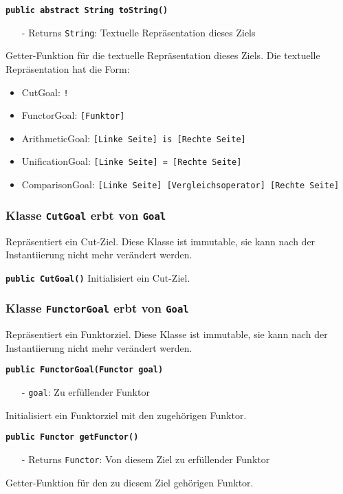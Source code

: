 \documentclass[parskip=full,11pt,twoside]{scrartcl}
\begin{document}
\textbf{\texttt{public abstract String toString()}}
\begin{itemize}[noitemsep]
	\item[-] Returns \texttt{String}: Textuelle Repräsentation dieses Ziels
\end{itemize}
Getter-Funktion für die textuelle Repräsentation dieses Ziels. Die textuelle Repräsentation hat die Form:
\begin{itemize}
	\item CutGoal: \texttt{!}
	\item FunctorGoal: \texttt{[Funktor]}
	\item ArithmeticGoal: \texttt{[Linke Seite] is [Rechte Seite]}
	\item UnificationGoal: \texttt{[Linke Seite] = [Rechte Seite]}
	\item ComparisonGoal: \texttt{[Linke Seite] [Vergleichsoperator] [Rechte Seite]}
\end{itemize}

\subsubsection{Klasse \texttt{CutGoal} erbt von \texttt{Goal}}
Repräsentiert ein Cut-Ziel. Diese Klasse ist immutable, sie kann nach der Instantiierung nicht mehr verändert werden.

\textbf{\texttt{public CutGoal()}}
Initialisiert ein Cut-Ziel.

\subsubsection{Klasse \texttt{FunctorGoal} erbt von \texttt{Goal}}
Repräsentiert ein Funktorziel. Diese Klasse ist immutable, sie kann nach der Instantiierung nicht mehr verändert werden.

\textbf{\texttt{public FunctorGoal(Functor goal)}}
\begin{itemize}[noitemsep]
	\item[-] \texttt{goal}: Zu erfüllender Funktor
\end{itemize}
Initialisiert ein Funktorziel mit den zugehörigen Funktor.

\textbf{\texttt{public Functor getFunctor()}}
\begin{itemize}[noitemsep]
	\item[-] Returns \texttt{Functor}: Von diesem Ziel zu erfüllender Funktor
\end{itemize}
Getter-Funktion für den zu diesem Ziel gehörigen Funktor.
\end{document}
